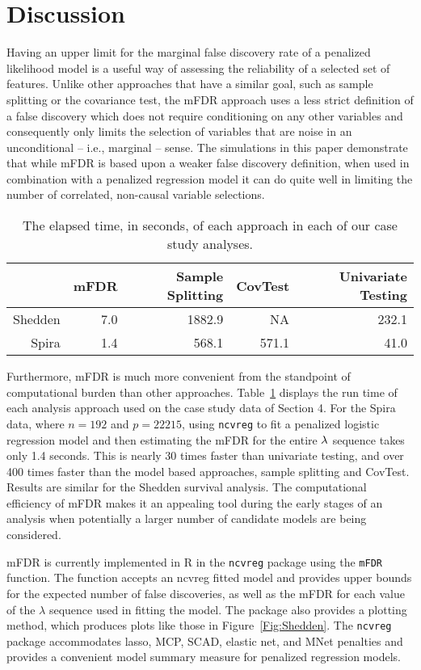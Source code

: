 \section{Discussion}

Having an upper limit for the marginal false discovery rate of a penalized likelihood model is a useful way of assessing the reliability of a selected set of features. Unlike other approaches that have a similar goal, such as sample splitting or the covariance test, the mFDR approach uses a less strict definition of a false discovery which does not require conditioning on any other variables and consequently only limits the selection of variables that are noise in an unconditional -- i.e., marginal -- sense.  The simulations in this paper demonstrate that while mFDR is based upon a weaker false discovery definition, when used in combination with a penalized regression model it can do quite well in limiting the number of correlated, non-causal variable selections.

\begin{table}[ht]
 \caption{\label{Tab:time} The elapsed time, in seconds, of each approach in each of our case study analyses.}
\centering
\begin{tabular}{rrrrr}
  \hline
 & mFDR & Sample Splitting & CovTest & Univariate Testing \\ 
  \hline
	Shedden & 7.0 & 1882.9 & NA & 232.1 \\
Spira & 1.4 & 568.1 & 571.1 & 41.0 \\ 
   \hline
\end{tabular}
\end{table}

Furthermore, mFDR is much more convenient from the standpoint of computational burden than other approaches.  Table~\ref{Tab:time} displays the run time of each analysis approach used on the case study data of Section 4. For the Spira data, where $n = 192$ and $p =22215$, using {\tt ncvreg} to fit a penalized logistic regression model and then estimating the mFDR for the entire $\lambda$ sequence takes only 1.4 seconds. This is nearly 30 times faster than univariate testing, and over 400 times faster than the model based approaches, sample splitting and CovTest.  Results are similar for the Shedden survival analysis.  The computational efficiency of mFDR makes it an appealing tool during the early stages of an analysis when potentially a larger number of candidate models are being considered.

mFDR is currently implemented in R in the {\tt ncvreg} package \citep{Breheny2011} using the {\tt mFDR} function. The function accepts an ncvreg fitted model and provides upper bounds for the expected number of false discoveries, as well as the mFDR for each value of the $\lambda$ sequence used in fitting the model.  The package also provides a plotting method, which produces plots like those in Figure~\ref{Fig:Shedden}.  The {\tt ncvreg} package accommodates lasso, MCP, SCAD, elastic net, and MNet \citep{Huang2016} penalties and provides a convenient model summary measure for penalized regression models.

